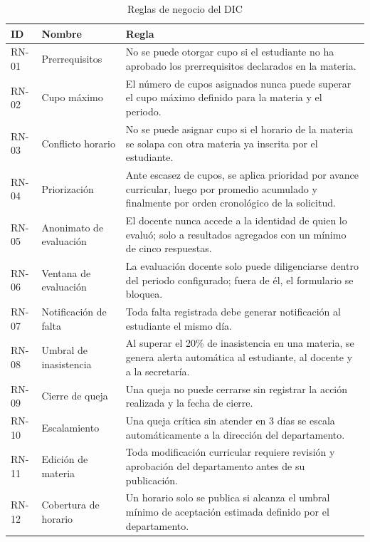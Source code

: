 \begin{table}[H]
\centering
\caption{Reglas de negocio del \ac{DIC}}
\label{tab:reglas}
\small
\begin{tabularx}{\textwidth}{@{}p{1.3cm} l X@{}}
\toprule
\rowcolor{naranjaClaro}
\textbf{ID} & \textbf{Nombre} & \textbf{Regla} \\
\midrule
RN-01 & Prerrequisitos &
    No se puede otorgar cupo si el estudiante no ha aprobado los prerrequisitos
    declarados en la materia. \\
RN-02 & Cupo máximo &
    El número de cupos asignados nunca puede superar el cupo máximo definido
    para la materia y el periodo. \\
RN-03 & Conflicto horario &
    No se puede asignar cupo si el horario de la materia se solapa con otra
    materia ya inscrita por el estudiante. \\
RN-04 & Priorización &
    Ante escasez de cupos, se aplica prioridad por avance curricular, luego por
    promedio acumulado y finalmente por orden cronológico de la solicitud. \\
RN-05 & Anonimato de evaluación &
    El docente nunca accede a la identidad de quien lo evaluó; solo a resultados
    agregados con un mínimo de cinco respuestas. \\
RN-06 & Ventana de evaluación &
    La evaluación docente solo puede diligenciarse dentro del periodo
    configurado; fuera de él, el formulario se bloquea. \\
RN-07 & Notificación de falta &
    Toda falta registrada debe generar notificación al estudiante el mismo día. \\
RN-08 & Umbral de inasistencia &
    Al superar el 20\% de inasistencia en una materia, se genera alerta
    automática al estudiante, al docente y a la secretaría. \\
RN-09 & Cierre de queja &
    Una queja no puede cerrarse sin registrar la acción realizada y la fecha de
    cierre. \\
RN-10 & Escalamiento &
    Una queja crítica sin atender en 3 días se escala automáticamente a la
    dirección del departamento. \\
RN-11 & Edición de materia &
    Toda modificación curricular requiere revisión y aprobación del departamento
    antes de su publicación. \\
RN-12 & Cobertura de horario &
    Un horario solo se publica si alcanza el umbral mínimo de aceptación
    estimada definido por el departamento. \\
\bottomrule
\end{tabularx}
\end{table}

